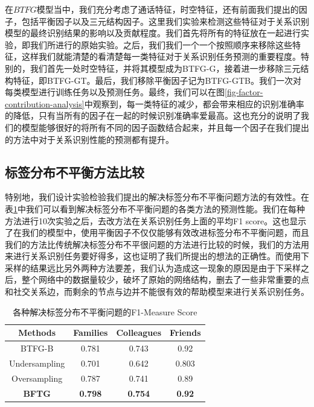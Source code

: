 在$BTFG$模型当中，我们充分考虑了通话特征，时空特征，还有前面我们提出的因子，包括平衡因子以及三元结构因子。这里我们实验来检测这些特征对于关系识别模型的最终识别结果的影响以及贡献程度。我们首先将所有的特征放在一起进行实验，即我们所进行的原始实验。之后，我们我们一个一个按照顺序来移除这些特征，这样我们就能清楚的看清楚每一类特征对于关系识别任务预测的重要程度。特别的，我们首先一处时空特征，并将其模型成为BTFG-G，接着进一步移除三元结构特征，即BTFG-GT。最后，我们移除平衡因子记为BTFG-GTB。我们一次对每类模型进行训练任务以及预测任务。最终，我们可以在图\ref{fig-factor-contribution-analysis}中观察到，每一类特征的减少，都会带来相应的识别准确率的降低，只有当所有的因子在一起的时候识别准确率爱最高。这也充分的说明了我们的模型能够很好的将所有不同的因子函数结合起来，并且每一个因子在我们提出的方法中对于关系识别性能的预测都有提升。

\subsection{标签分布不平衡方法比较}

特别地，我们设计实验检验我们提出的解决标签分布不平衡问题方法的有效性。在表\ref{tb-imbalance-methods}中我们可以看到解决标签分布不平衡问题的各类方法的预测性能。我们在每种方法进行10次实验之后，去改方法在关系识别任务上面的平均F1 score。这也显示了在我们的模型中，使用平衡因子不仅仅能够有效改进标签分布不平衡问题，而且我们的方法比传统解决标签分布不平很问题的方法进行比较的时候，我们的方法用来进行关系识别任务要好得多，这也证明了我们所提出的想法的正确性。而使用下采样的结果远比另外两种方法要差，我们认为造成这一现象的原因是由于下采样之后，整个网络中的数据量较少，破坏了原始的网络结构，删去了一些非常重要的点和社交关系边，而剩余的节点与边并不能很有效的帮助模型来进行关系识别任务。


\begin{table}
\center
\caption{各种解决标签分布不平衡问题的F1-Measure Score}
\label{tb-imbalance-methods}
\begin{tabular}{|c|c|c|c|}
\hline
Methods & Families & Colleagues & Friends \\ \hline \hline
BTFG-B &0.781 & 0.743 & 0.92 \\ 
Undersampling & 0.701 & 0.642 &0.803 \\ 
Oversampling & 0.787 & 0.741 & 0.89\\ \hline
\textbf{BFTG} & \textbf{0.798} &  \textbf{0.754} & \textbf{0.92} \\ \hline
\end{tabular}
\end{table}


